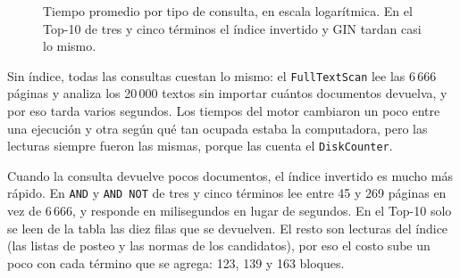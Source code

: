 \begin{figure}[H]
\centering
{}
\caption{Tiempo promedio por tipo de consulta, en escala logarítmica. En el
Top-10 de tres y cinco términos el índice invertido y GIN tardan casi lo mismo.}
\label{fig:e6-latencia}
\end{figure}

Sin índice, todas las consultas cuestan lo mismo: el \texttt{FullTextScan} lee
las 6\,666 páginas y analiza los 20\,000 textos sin importar cuántos documentos
devuelva, y por eso tarda varios segundos. Los tiempos del motor cambiaron un
poco entre una ejecución y otra según qué tan ocupada estaba la computadora,
pero las lecturas siempre fueron las mismas, porque las cuenta el
\texttt{DiskCounter}.

Cuando la consulta devuelve pocos documentos, el índice invertido es mucho más
rápido. En \texttt{AND} y \texttt{AND NOT} de tres y cinco términos lee entre 45
y 269 páginas en vez de 6\,666, y responde en milisegundos en lugar de segundos.
En el Top-10 solo se leen de la tabla las diez filas que se devuelven. El resto
son lecturas del índice (las listas de posteo y las normas de los candidatos),
por eso el costo sube un poco con cada término que se agrega: 123, 139 y 163
bloques.

